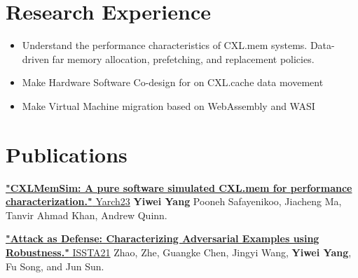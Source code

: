\documentclass{resume}
\newcommand{\en}[1]{#1}
\newcommand{\zh}[1]{}
\begin{document}
\section{\en{Research Experience}\zh{研究经历}}

\en{}
\zh{\datedsubsection{\textbf{\href{https://www.ssrc.ucsc.edu/index.html}{加州大学圣克鲁兹分校存储中心}}}{08/2022 -- 现在}}
\en{}
\zh{\role{研究生科研}{助理}}
\begin{itemize}
      \item \small{ \en{Understand the performance characteristics of CXL.mem systems. Data-driven far memory allocation, prefetching, and replacement policies. } \zh{理解CXL.mem的性能分析。数据驱动的远端内存分配、预取和替换策略。}}
      \item \small{ \en{Make Hardware Software Co-design for on CXL.cache data movement}
      \zh{设计一种硬件软件协同的CXL.cache数据迁移方法。}}
      \item \small{ \en{Make Virtual Machine migration based on WebAssembly and WASI}
      \zh{设计一种基于WebAssembly和WASI的虚拟机迁移方法。}}
\end{itemize}

\section{\en{Publications}\zh{论文}}
\href{https://arxiv.org/pdf/2303.06153.pdf}{\textbf{"CXLMemSim: A pure software simulated CXL.mem for performance characterization."} Yarch23} \textbf{Yiwei Yang} Pooneh Safayenikoo, Jiacheng Ma, Tanvir Ahmad Khan, Andrew Quinn.

\href{https://arxiv.org/pdf/2103.07633.pdf}{\textbf{"Attack as Defense: Characterizing Adversarial Examples using Robustness."} ISSTA21} Zhao, Zhe, Guangke Chen, Jingyi Wang, \textbf{Yiwei Yang}, Fu Song, and Jun Sun. 
      
\end{document}
